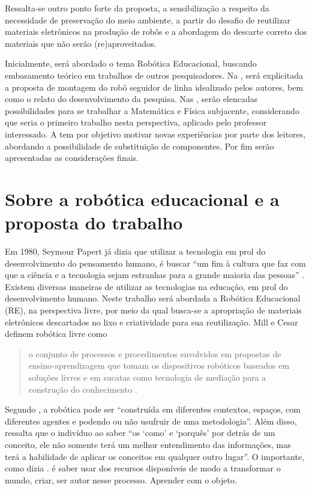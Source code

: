 \documentclass{textolivre-html}
\begin{document}
Ressalta-se outro ponto forte da proposta, a sensibilização a respeito da
necessidade de preservação do meio ambiente, a partir do desafio de reutilizar
materiais eletrônicos na produção de robôs e a abordagem do descarte correto
dos materiais que não serão (re)aproveitados.

Inicialmente, será abordado o tema Robótica Educacional, buscando embasamento
teórico em trabalhos de outros pesquisadores. Na , será explicitada a
proposta de montagem do robô seguidor de linha idealizado pelos autores, bem
como o relato do desenvolvimento da pesquisa. Nas , serão elencadas
possibilidades para se trabalhar a Matemática e Física subjacente, considerando
que seria o primeiro trabalho nesta perspectiva, aplicado pelo professor
interessado. A  tem por objetivo motivar novas experiências por parte
dos leitores, abordando a possibilidade de substituição de componentes. Por fim
serão apresentadas as considerações finais.



\section{Sobre a robótica educacional e a proposta do trabalho}\label{sec-robotica}
Em 1980, Seymour Papert já dizia que utilizar a tecnologia em prol do
desenvolvimento do pensamento humano, é buscar “um fim à cultura que faz com
que a ciência e a tecnologia sejam estranhas para a grande maioria das pessoas”
\cite[p. 4, tradução nossa]{papert1980}. Existem diversas maneiras de utilizar as
tecnologias na educação, em prol do desenvolvimento humano. Neste trabalho será
abordada a Robótica Educacional (RE), na perspectiva livre, por meio da qual
busca-se a apropriação de materiais eletrônicos descartados no lixo e
criatividade para sua reutilização. Mill e Cesar definem robótica livre como
\begin{quote}
o conjunto de processos e procedimentos envolvidos em propostas de
ensino-aprendizagem que tomam os dispositivos robóticos baseados
em soluções livres e em sucatas como tecnologia de mediação para a
construção do conhecimento \cite[p. 222]{mill2009}.
\end{quote}

Segundo \textcite[p. 71]{barbosa2016}, a robótica pode ser “construída em diferentes
contextos, espaços, com diferentes agentes e podendo ou não usufruir de uma
metodologia”. Além disso, \textcite[p. 60]{campos2005} ressalta que o indivíduo ao
saber “os ‘como’ e ‘porquês’ por detrás de um conceito, ele não somente terá um
melhor entendimento das informações, mas terá a habilidade de aplicar os
conceitos em qualquer outro lugar”. O importante, como dizia \textcite[p. 44]{barbosa2016}.
é saber usar dos recursos disponíveis de modo a transformar o mundo, criar,
ser autor nesse processo. Aprender com o objeto.
\end{document}
